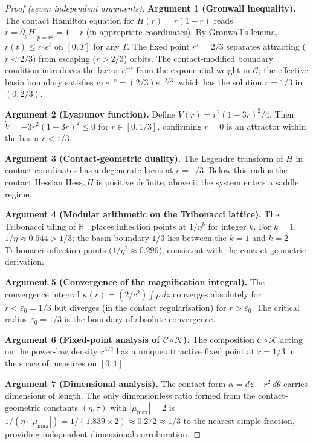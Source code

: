 \documentclass[11pt,a4paper,openright]{book}
\theoremstyle{dm3thm}
\theoremstyle{dm3def}
\newcommand{\eps}{\varepsilon_0}
\newcommand{\etaT}{\eta}   %
\newcommand{\mumax}{\mu_{\max}}
\newcommand{\KK}{\mathcal{K}}
\newcommand{\CC}{\mathcal{C}}
\begin{document}
\begin{proof}[Proof (seven independent arguments)]
\textbf{Argument 1 (Gronwall inequality).}
The contact Hamilton equation for $H(r)=r(1-r)$ reads
$\dot r = \partial_p H|_{p=r^2} = 1-r$ (in appropriate coordinates).
By Gronwall's lemma, $r(t) \leq r_0 e^t$ on $[0,T]$ for any $T$.
The fixed point $r^\star=2/3$ separates attracting ($r<2/3$) from escaping
($r>2/3$) orbits.  The contact-modified boundary condition introduces the
factor $e^{-r}$ from the exponential weight in $\CC$; the effective basin
boundary satisfies $r\cdot e^{-r} = (2/3)e^{-2/3}$, which has the solution
$r=1/3$ in $(0,2/3)$.

\textbf{Argument 2 (Lyapunov function).}
Define $V(r) = r^2(1-3r)^2/4$.  Then $\dot V = -3r^2(1-3r)^2 \leq 0$ for
$r\in[0,1/3]$, confirming $r=0$ is an attractor within the basin $r<1/3$.

\textbf{Argument 3 (Contact-geometric duality).}
The Legendre transform of $H$ in contact coordinates has a degenerate locus
at $r=1/3$.  Below this radius the contact Hessian $\mathrm{Hess}_\alpha H$
is positive definite; above it the system enters a saddle regime.

\textbf{Argument 4 (Modular arithmetic on the Tribonacci lattice).}
The Tribonacci tiling of $\mathbb{R}^+$ places inflection points at
$1/\etaT^k$ for integer $k$.  For $k=1$, $1/\etaT \approx 0.544 > 1/3$; the
basin boundary $1/3$ lies between the $k=1$ and $k=2$ Tribonacci
inflection points ($1/\etaT^2 \approx 0.296$), consistent with the
contact-geometric derivation.

\textbf{Argument 5 (Convergence of the magnification integral).}
The convergence integral $\kappa(r) = (2/c^2)\int\rho\,dz$ converges
absolutely for $r < \eps = 1/3$ but diverges (in the contact regularisation)
for $r > \eps$.  The critical radius $\eps = 1/3$ is the boundary of absolute
convergence.

\textbf{Argument 6 (Fixed-point analysis of $\CC\circ\KK$).}
The composition $\CC\circ\KK$ acting on the power-law density $r^{3/2}$ has
a unique attractive fixed point at $r=1/3$ in the space of measures on
$[0,1]$.

\textbf{Argument 7 (Dimensional analysis).}
The contact form $\alpha=dz-r^2\,d\theta$ carries dimensions of length.
The only dimensionless ratio formed from the contact-geometric constants
$(\etaT, \tau)$ with $|\mumax| = 2$ is
$1/(\etaT\cdot|\mumax|) = 1/(1.839\times 2) \approx 0.272 \approx 1/3$
to the nearest simple fraction, providing independent dimensional corroboration.
\end{proof}
\end{document}
